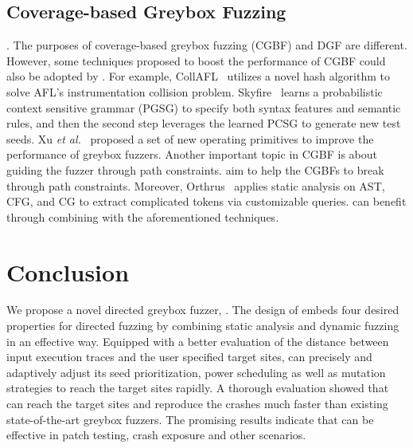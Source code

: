 \subsection{Coverage-based Greybox Fuzzing}.
The purposes of coverage-based greybox fuzzing (CGBF) and DGF are different. However, some techniques proposed to boost the performance of CGBF could also be adopted by \dFOT.
For example, CollAFL~\cite{CollAFL} utilizes a novel hash algorithm to solve AFL's instrumentation collision problem.
Skyfire~\cite{junjie:2017sp:skyfire} learns a probabilistic context sensitive grammar (PGSG) to specify both syntax features and semantic rules, and then the second step leverages the learned PCSG to generate new test seeds.
Xu \textit{et al.}~\cite{XuKMK:2017} proposed a set of new operating primitives to improve the performance of greybox fuzzers.
Another important topic in CGBF is about guiding the fuzzer through path constraints. \cite{Stephens2016Driller, rawat:2017, LiCMLLT17, Angora, tfuzz} aim to help the CGBFs to break through path constraints.
Moreover, Orthrus~\cite{Shastry:LNCS2017:Orthrus} applies static analysis on AST, CFG, and CG to extract complicated tokens via customizable queries. 
\dFOT can benefit through combining with the aforementioned techniques.

%
 \section{Conclusion}
We propose a novel directed greybox fuzzer, \dFOT.
The design of \dFOT embeds four desired properties for directed fuzzing by combining static analysis and dynamic fuzzing in an effective way.
Equipped with a better evaluation of the distance between input execution traces and the user specified target sites, \dFOT can precisely and adaptively adjust its seed prioritization, power scheduling as well as mutation strategies to reach the target sites rapidly.
A thorough evaluation showed that \dFOT can reach the target sites and reproduce the crashes much faster than existing state-of-the-art greybox fuzzers.
The promising results indicate that \dFOT can be effective in patch testing, crash exposure and other scenarios. 